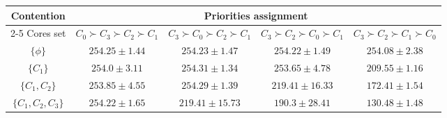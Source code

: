 \begin{tabular}{|c||c|c|c|c|}
    \hline
    \multirow{2}{*}{Contention}               & \multicolumn{4}{c|}{Priorities assignment} \\
    \cline{2-5} %
    Cores set                 & $C_{0} \succ C_{3} \succ C_{2} \succ C_{1}$ & $C_{3} \succ C_{0} \succ C_{2} \succ C_{1}$ & $C_{3} \succ C_{2} \succ C_{0} \succ C_{1}$ & $C_{3} \succ C_{2} \succ C_{1} \succ C_{0}$ \\
    \hline
    \hline
    $\{\phi\}$                & $254.25 \pm 1.44$ & $254.23 \pm 1.47$ & $254.22 \pm 1.49$ & $254.08 \pm 2.38$ \\
    \hline
    $\{C_{1}\}$               & $254.0 \pm 3.11$ & $254.31 \pm 1.34$ & $253.65 \pm 4.78$ & $209.55 \pm 1.16$ \\
    \hline
    $\{C_{1}, C_{2}\}$        & $253.85 \pm 4.55$ & $254.29 \pm 1.39$ & $219.41 \pm 16.33$ & $172.41 \pm 1.54$ \\
    \hline
    $\{C_{1}, C_{2}, C_{3}\}$ & $254.22 \pm 1.65$ & $219.41 \pm 15.73$ & $190.3 \pm 28.41$ & $130.48 \pm 1.48$ \\
    \hline
\end{tabular}
